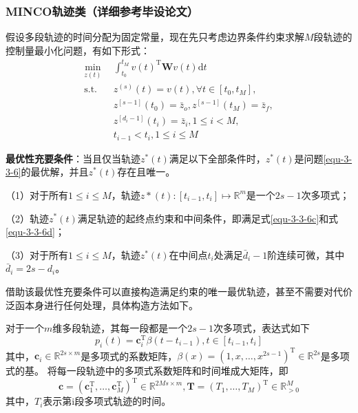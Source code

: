 \subsubsection{MINCO轨迹类（详细参考毕设论文）}
    假设多段轨迹的时间分配为固定常量，现在先只考虑边界条件约束求解\(M\)段轨迹的控制量最小化问题，有如下形式：
\begin{subequations}\label{equ-3-3-6}
\begin{align}
    \min_{z(t)}\ \  &\int_{t_0}^{t_M}v(t)^\mathrm{T}\mathbf{W}v(t)\mathrm{d}t\label{equ-3-3-6a} \\
    \text{s.t.}\  \  &z^{(s)}(t)=v(t),\forall t\in[t_0,t_M],\label{equ-3-3-6b}  \\
    &z^{[s-1]}(t_0)=\bar{z}_o,z^{[s-1]}(t_M)=\bar{z}_f,\label{equ-3-3-6c} \\
    &z^{[d_i-1]}(t_i)=\bar{z}_i,1\leq i<M,\label{equ-3-3-6d} \\
    &t_{i-1}<t_i,1\leq i\leq M\label{equ-3-3-6e}
\end{align}
\end{subequations}

\begin{tcolorbox}[green]
\textbf{最优性充要条件}：当且仅当轨迹\(z^*(t)\)满足以下全部条件时，\(z^*(t)\)是问题\eqref{equ-3-3-6}的最优解，并且\(z^*(t)\)存在且唯一。


（1）对于所有\(1\leq i \leq M \)，轨迹\(z*(t):[t_{i-1},t_i]\mapsto \mathbb{R} ^m\)是一个\(2s-1\)次多项式；


（2）轨迹\(z^*(t)\)满足轨迹的起终点约束和中间条件，即满足式\eqref{equ-3-3-6c}和式\eqref{equ-3-3-6d}；


（3）对于所有\(1\leq i \leq M \)，轨迹\(z^*(t)\)在中间点\(t_i\)处满足\(\bar{d}_i-1\)阶连续可微，其中\(\bar{d}_i=2s-d_i\)。
\end{tcolorbox}



借助该最优性充要条件可以直接构造满足约束的唯一最优轨迹，甚至不需要对代价泛函本身进行任何处理，具体构造方法如下。


对于一个\(m\)维多段轨迹，其每一段都是一个\(2s-1\)次多项式，表达式如下
\begin{equation}\label{equ-3-3-7}
p_i(t)=\mathbf{c}_i^\mathrm{T}\beta(t-t_{i-1}),t\in[t_{i-1},t_i]
\end{equation}
其中，\(\mathbf{c}_i \in \mathbb{R} ^{2s\times m}\)是多项式的系数矩阵，\(\beta(x)=(1,x,\ldots,x^{2s-1})^\mathrm{T}\in \mathbb{R} ^{2s}\)是多项式的基。
将每一段轨迹中的多项式系数矩阵和时间堆成大矩阵，即
\begin{equation}\label{equ-3-3-8}
\mathbf{c}=\left(\mathbf{c}_1^\mathrm{T},\ldots,\mathbf{c}_M^\mathrm{T}\right)^\mathrm{T}\in \mathbb{R} ^{2Ms\times m},\mathbf{T}=\left(T_1,\ldots,T_M\right)^\mathrm{T}\in \mathbb{R} ^M_{>0}
\end{equation}
其中，\(T_i\)表示第i段多项式轨迹的时间。

